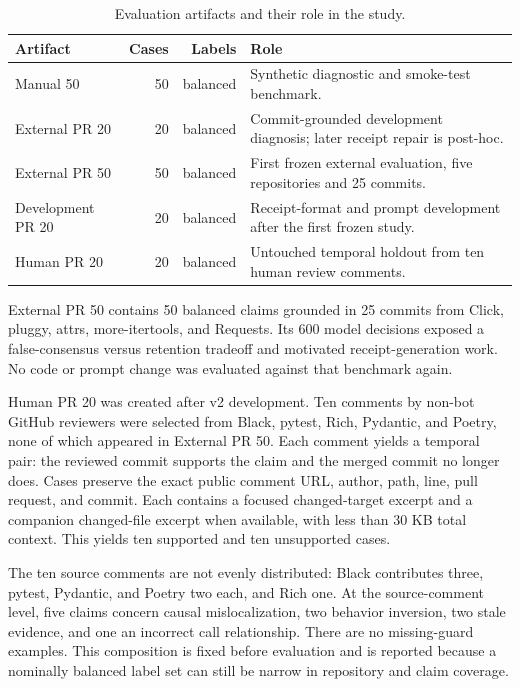 \documentclass[acmsmall,screen,review,anonymous]{acmart}
\begin{document}
\begin{table}[h]
\centering
\caption{Evaluation artifacts and their role in the study.}
\label{tab:benchmarks}
\small
\begin{tabularx}{\linewidth}{@{}lrr>{\raggedright\arraybackslash}X@{}}
\toprule
Artifact & Cases & Labels & Role \\
\midrule
Manual 50 & 50 & balanced & Synthetic diagnostic and smoke-test benchmark. \\
External PR 20 & 20 & balanced & Commit-grounded development diagnosis; later receipt repair is post-hoc. \\
External PR 50 & 50 & balanced & First frozen external evaluation, five repositories and 25 commits. \\
Development PR 20 & 20 & balanced & Receipt-format and prompt development after the first frozen study. \\
Human PR 20 & 20 & balanced & Untouched temporal holdout from ten human review comments. \\
\bottomrule
\end{tabularx}
\end{table}

External PR 50 contains 50 balanced claims grounded in 25 commits from Click, pluggy, attrs, more-itertools, and Requests. Its 600 model decisions exposed a false-consensus versus retention tradeoff and motivated receipt-generation work. No code or prompt change was evaluated against that benchmark again.

Human PR 20 was created after v2 development. Ten comments by non-bot GitHub reviewers were selected from Black, pytest, Rich, Pydantic, and Poetry, none of which appeared in External PR 50. Each comment yields a temporal pair: the reviewed commit supports the claim and the merged commit no longer does. Cases preserve the exact public comment URL, author, path, line, pull request, and commit. Each contains a focused changed-target excerpt and a companion changed-file excerpt when available, with less than 30 KB total context. This yields ten supported and ten unsupported cases.

The ten source comments are not evenly distributed: Black contributes three, pytest, Pydantic, and Poetry two each, and Rich one. At the source-comment level, five claims concern causal mislocalization, two behavior inversion, two stale evidence, and one an incorrect call relationship. There are no missing-guard examples. This composition is fixed before evaluation and is reported because a nominally balanced label set can still be narrow in repository and claim coverage.
\end{document}

